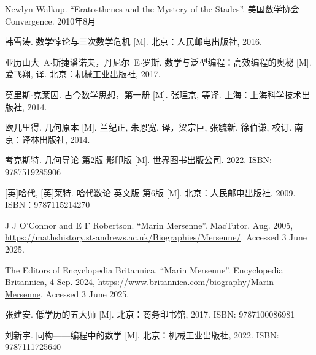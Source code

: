 Newlyn Walkup. ``Eratosthenes and the Mystery of the Stades''. 美国数学协会 Convergence. 2010年8月

韩雪涛. 数学悖论与三次数学危机 [M]. 北京：人民邮电出版社, 2016. %

亚历山大\ A$\cdot$斯捷潘诺夫，丹尼尔\ E$\cdot$罗斯. 数学与泛型编程：高效编程的奥秘 [M]. 爱飞翔, 译. 北京：机械工业出版社, 2017. %

莫里斯$\cdot$克莱因. 古今数学思想，第一册 [M]. 张理京, 等译. 上海：上海科学技术出版社, 2014. %

欧几里得. 几何原本 [M]. 兰纪正, 朱恩宽, 译，梁宗巨, 张毓新, 徐伯谦, 校订. 南京：译林出版社, 2014. %

考克斯特. 几何导论 第2版 影印版 [M]. 世界图书出版公司. 2022. ISBN: 9787519285906

[英]哈代, [英]莱特. 哈代数论 英文版 第6版 [M]. 北京：人民邮电出版社. 2009. ISBN：9787115214270

J J O'Connor and E F Robertson. ``Marin Mersenne''. MacTutor. Aug. 2005, \url{https://mathshistory.st-andrews.ac.uk/Biographies/Mersenne/}. Accessed 3 June 2025.

The Editors of Encyclopedia Britannica. ``Marin Mersenne''. Encyclopedia Britannica, 4 Sep. 2024, \url{https://www.britannica.com/biography/Marin-Mersenne}. Accessed 3 June 2025.

张建安. 低学历的五大师 [M]. 北京：商务印书馆, 2017. ISBN: 9787100086981

刘新宇. 同构——编程中的数学 [M]. 北京：机械工业出版社, 2022. ISBN: 9787111725640
